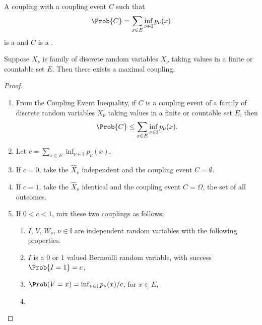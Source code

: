 \documentclass[12pt]{article}
\begin{document}
\begin{definition}
    A coupling with a coupling event \( C \) such that
    \[
        \Prob{C} = \sum\limits_{x \in E} \inf_{\nu \in \mathbb{I}} p_\nu
        (x)
    \] is a  and \( C \) is a .
\end{definition}

\begin{lemma}
    Suppose \( X_{\nu} \) is family of discrete random variables \( X_{\nu}
    \) taking values in a finite or countable set \( E \).  Then there
    exists a maximal coupling.
\end{lemma}

\begin{proof}
    \begin{enumerate}
        \item
            From the Coupling Event Inequality, if \( C \) is a coupling
            event of a family of discrete random variables \( X_{\nu} \)
            taking values in a finite or countable set \( E \), then
            \[
                \Prob{C} \le \sum\limits_{x \in E} \inf_{\nu \in \mathbb
                {I}} p_\nu(x).
            \]
        \item
            Let \( c = \sum\limits_{x \in E} \inf_{\nu \in \mathbb{I}} p_\nu
            (x) \).
        \item
            If \( c = 0 \), take the \( \hat{X}_{\nu} \) independent and
            the coupling event \( C = \emptyset \).
        \item
            If \( c = 1 \), take the \( \hat{X}_{\nu} \) identical and
            the coupling event \( C = \Omega \), the set of all
            outcomes.
        \item
            If \( 0 < c < 1 \), mix these two couplings as follows:
            \begin{enumerate}
                \item
                    \( I \), \( V \), \( W_{\nu} \), \( \nu \in \mathbb{I}
                    \) are independent random variables with the
                    following properties.
                \item
                    \( I \) is a \( 0 \) or \( 1 \) valued Bernoulli
                    random variable, with success \( \Prob{I=1} = c \),
                \item
                    \( \Prob(V = x) = \inf_{\nu \in \mathbb{I}} p_{\nu}(x)/c
                    \), for \( x \in E \),
                \item

\end{enumerate}
\end{enumerate}
\end{proof}
\end{document}
